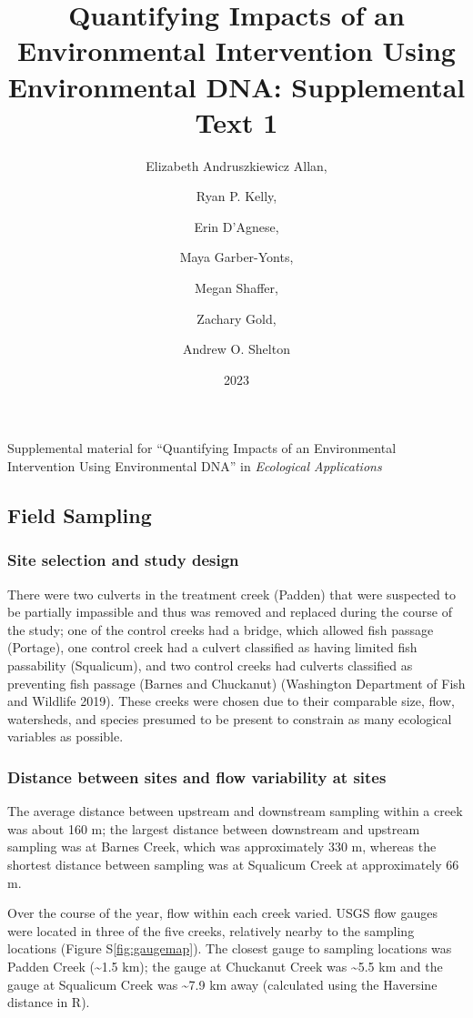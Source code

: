 \documentclass[
]{article}
\title{Quantifying Impacts of an Environmental Intervention Using
Environmental DNA: Supplemental Text 1}
\author{Elizabeth Andruszkiewicz Allan, \and Ryan P. Kelly, \and Erin
D'Agnese, \and Maya Garber-Yonts, \and Megan Shaffer, \and Zachary
Gold, \and Andrew O. Shelton}
\date{2023}
\begin{document}
\maketitle

Supplemental material for ``Quantifying Impacts of an Environmental
Intervention Using Environmental DNA'' in
\textit{Ecological Applications}

\hypertarget{field-sampling}{%
\subsection{Field Sampling}\label{field-sampling}}

\hypertarget{site-selection-and-study-design}{%
\subsubsection{Site selection and study
design}\label{site-selection-and-study-design}}

There were two culverts in the treatment creek (Padden) that were
suspected to be partially impassible and thus was removed and replaced
during the course of the study; one of the control creeks had a bridge,
which allowed fish passage (Portage), one control creek had a culvert
classified as having limited fish passability (Squalicum), and two
control creeks had culverts classified as preventing fish passage
(Barnes and Chuckanut) (Washington Department of Fish and Wildlife
2019). These creeks were chosen due to their comparable size, flow,
watersheds, and species presumed to be present to constrain as many
ecological variables as possible.

\hypertarget{distance-between-sites-and-flow-variability-at-sites}{%
\subsubsection{Distance between sites and flow variability at
sites}\label{distance-between-sites-and-flow-variability-at-sites}}

The average distance between upstream and downstream sampling within a
creek was about 160 m; the largest distance between downstream and
upstream sampling was at Barnes Creek, which was approximately 330 m,
whereas the shortest distance between sampling was at Squalicum Creek at
approximately 66 m.

Over the course of the year, flow within each creek varied. USGS flow
gauges were located in three of the five creeks, relatively nearby to
the sampling locations (Figure S\ref{fig:gaugemap}). The closest gauge
to sampling locations was Padden Creek (\textasciitilde1.5 km); the
gauge at Chuckanut Creek was \textasciitilde5.5 km and the gauge at
Squalicum Creek was \textasciitilde7.9 km away (calculated using the
Haversine distance in R).
\end{document}
